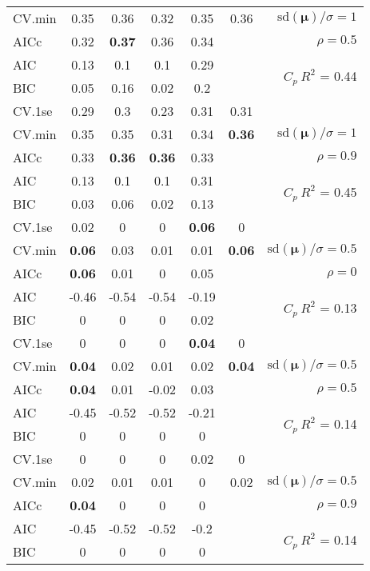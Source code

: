\documentclass[12pt]{article}
\newcommand{\mr}[1]{\mathrm{#1}}
\newcommand{\bm}[1]{\mathbf{#1}}
\begin{document}
\begin{table}[p]
\begin{center}
\begin{tabular}{l*{5}{c}|r}
CV.min & 0.35 & 0.36 & 0.32 & 0.35 & 0.36 &  $\mr{sd}(\bm{\mu})/\sigma=1$ \\
AICc & 0.32 & {\bf 0.37} & 0.36 & 0.34 & & $\rho=0.5$ \\
AIC & 0.13 & 0.1 & 0.1 & 0.29 & & \multirow{2}{*}{$C_p ~ R^2$ = 0.44} \\
BIC & 0.05 & 0.16 & 0.02 & 0.2 & & \\
 \hline 
CV.1se & 0.29 & 0.3 & 0.23 & 0.31 & 0.31 &\\
CV.min & 0.35 & 0.35 & 0.31 & 0.34 & {\bf 0.36} &  $\mr{sd}(\bm{\mu})/\sigma=1$ \\
AICc & 0.33 & {\bf 0.36} & {\bf 0.36} & 0.33 & & $\rho=0.9$ \\
AIC & 0.13 & 0.1 & 0.1 & 0.31 & & \multirow{2}{*}{$C_p ~ R^2$ = 0.45} \\
BIC & 0.03 & 0.06 & 0.02 & 0.13 & & \\
 \hline 
CV.1se & 0.02 & 0 & 0 & {\bf 0.06} & 0 &\\
CV.min & {\bf 0.06} & 0.03 & 0.01 & 0.01 & {\bf 0.06} &  $\mr{sd}(\bm{\mu})/\sigma=0.5$ \\
AICc & {\bf 0.06} & 0.01 & 0 & 0.05 & & $\rho=0$ \\
AIC & -0.46 & -0.54 & -0.54 & -0.19 & & \multirow{2}{*}{$C_p ~ R^2$ = 0.13} \\
BIC & 0 & 0 & 0 & 0.02 & & \\
 \hline 
CV.1se & 0 & 0 & 0 & {\bf 0.04} & 0 &\\
CV.min & {\bf 0.04} & 0.02 & 0.01 & 0.02 & {\bf 0.04} &  $\mr{sd}(\bm{\mu})/\sigma=0.5$ \\
AICc & {\bf 0.04} & 0.01 & -0.02 & 0.03 & & $\rho=0.5$ \\
AIC & -0.45 & -0.52 & -0.52 & -0.21 & & \multirow{2}{*}{$C_p ~ R^2$ = 0.14} \\
BIC & 0 & 0 & 0 & 0 & & \\
 \hline 
CV.1se & 0 & 0 & 0 & 0.02 & 0 &\\
CV.min & 0.02 & 0.01 & 0.01 & 0 & 0.02 &  $\mr{sd}(\bm{\mu})/\sigma=0.5$ \\
AICc & {\bf 0.04} & 0 & 0 & 0 & & $\rho=0.9$ \\
AIC & -0.45 & -0.52 & -0.52 & -0.2 & & \multirow{2}{*}{$C_p ~ R^2$ = 0.14} \\
BIC & 0 & 0 & 0 & 0 & & \\
 \hline 
\end{tabular}
\end{center}
\vspace{-1cm}
\end{table}
\end{document}
